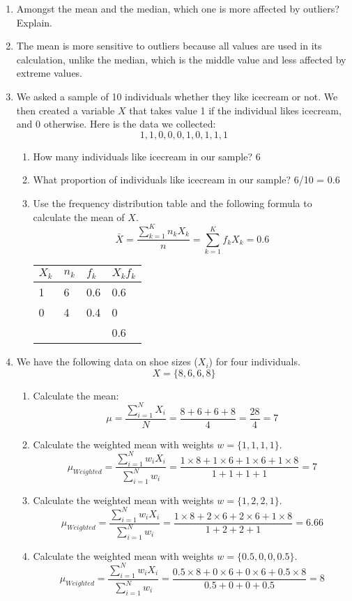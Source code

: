 \documentclass{./../../Latex/handout}
\begin{document}
\begin{enumerate}
\item Amongst the mean and the median, which one is more affected by outliers? Explain. 
\item[] The mean is more sensitive to outliers because all values are used in its calculation, unlike the median, which is the middle value and less affected by extreme values.
\item We asked a sample of 10 individuals whether they like icecream or not. We then created a variable $X$ that takes value 1 if the individual likes icecream, and 0 otherwise.  Here is the data we collected:
$$ 1, 1, 0, 0, 0, 1, 0, 1, 1, 1 $$

\begin{enumerate}
\item How many individuals like icecream in our sample? 6
\item What proportion of individuals like icecream in our sample? 6/10 = 0.6
\item Use the frequency distribution table and the following formula to calculate the mean of $X$. 
$$ \bar{X} = \frac{\sum_{k=1}^K n_k X_k}{n} = \sum_{k=1}^K f_k X_k = 0.6 $$

\begin{center}
\begin{tabularx}{0.5\textwidth}{Y|Y|Y|Y}
  $X_k$ & $n_k$ & $f_k$ & $X_k f_k$ \\
   & 6 & 0.6 & 0.6 \\
  0 & 4 & 0.4 & 0 \\
\hline
& & &  0.6
\end{tabularx}
\end{center}


\end{enumerate}

\newpage
\item We have the following data on shoe sizes ($X_i$) for four individuals. 
$$ X = \{8, 6, 6, 8 \}$$
\begin{enumerate}
\item Calculate the mean:
$$ \mu = \frac {\sum_{i=1}^N X_i}{N} = \frac{8 + 6 + 6 + 8}{4} = \frac{28}{4} = 7 $$ 
\item Calculate the weighted mean with weights $ w=  \{1, 1, 1, 1 \}$.
$$ \mu_{Weighted} = \frac {\sum_{i=1}^N w_i X_i}{\sum_{i=1}^N w_i } = \frac{1\times 8 + 1\times 6 + 1\times 6 + 1\times 8}{1+1+1+1} = 7 $$ 
\item Calculate the weighted mean with weights $ w=  \{1, 2, 2, 1 \}$.
$$ \mu_{Weighted} = \frac {\sum_{i=1}^N w_i X_i}{\sum_{i=1}^N w_i } = \frac{1\times 8 + 2\times 6 + 2\times 6 + 1\times 8}{1+2+2+1} = 6.66  $$ 
\item Calculate the weighted mean with weights $ w=  \{0.5, 0, 0, 0.5 \}$.
$$ \mu_{Weighted} = \frac {\sum_{i=1}^N w_i X_i}{\sum_{i=1}^N w_i } = \frac{0.5\times 8 + 0\times 6 + 0\times 6 + 0.5\times 8}{0.5 + 0 + 0 + 0.5} =8  $$ 
\end{enumerate}
\vspace{4em}
\end{enumerate}
\end{document}

